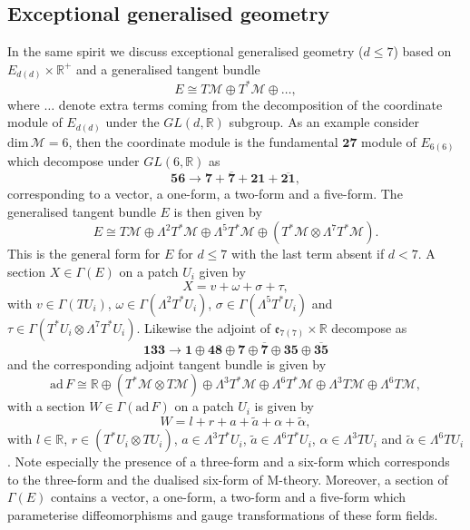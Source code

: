 \subsection{Exceptional generalised geometry}
In the same spirit we discuss exceptional generalised geometry ($d\leq 7$) based on $E_{d(d)}\times \mathbb{R}^+$ and a generalised tangent bundle 
\begin{equation}
    E\cong T\mathcal{M}\oplus T^*\mathcal{M}\oplus\ldots,
\end{equation}
where $\ldots$ denote extra terms coming from the decomposition of the coordinate module of $E_{d(d)}$ under the $GL(d,\mathbb{R})$ subgroup. As an example consider $\text{dim}\,\mathcal{M}=6$, then the coordinate module is the fundamental $\mathbf{27}$ module of $E_{6(6)}$ which decompose under $GL(6,\mathbb{R})$ as 
\begin{equation}
    \mathbf{56}\to \mathbf{7}+\overbar{\mathbf{7}}+\mathbf{21}+\overbar{\mathbf{21}},
\end{equation}
corresponding to a vector, a one-form, a two-form and a five-form. The generalised tangent bundle $E$ is then given by 
\begin{equation}
    E \cong T\mathcal{M}\oplus\Lambda^2T^*\mathcal{M}\oplus\Lambda^5T^*\mathcal{M}\oplus\left(T^*\mathcal{M}\otimes \Lambda^7T^*\mathcal{M}\right).
\end{equation}
This is the general form for $E$ for $d\leq7$ with the last term absent if $d<7$. A section $X\in\Gamma(E)$ on a patch $U_i$ given by 
\begin{equation}
    X = v+\omega+\sigma+\tau,
\end{equation}
with $v\in\Gamma(TU_i)$, $\omega\in\Gamma(\Lambda^2T^*U_i)$, $\sigma\in\Gamma(\Lambda^5T^*U_i)$ and $\tau \in\Gamma(T^*U_i\otimes \Lambda^7T^*U_i)$.  Likewise the adjoint of $\mathfrak{e}_{7(7)}\times\mathbb{R}$ decompose as
\begin{equation}
    \mathbf{133}\to \mathbf{1}\oplus\mathbf{48}\oplus\mathbf{7}\oplus\overbar{\mathbf{7}}\oplus\mathbf{35}\oplus\overbar{\mathbf{35}}
\end{equation}
and the corresponding adjoint tangent bundle is given by
\begin{equation}
    \text{ad}\, F \cong \mathbb{R}\oplus \left(T^*\mathcal{M}\otimes T\mathcal{M}\right)\oplus \Lambda^3 T^*\mathcal{M}\oplus\Lambda^6 T^*\mathcal{M}\oplus\Lambda^3 T\mathcal{M}\oplus\Lambda^6 T\mathcal{M},
\end{equation}
with a section $W\in\Gamma(\text{ad}\,F)$ on a patch $U_i$ is given by
\begin{equation}\label{eq:AdDecompE7}
    W = l+r+a+\tilde{a}+\alpha+\tilde{\alpha},
\end{equation}
with $l\in\mathbb{R}$, $r\in (T^*U_i\otimes TU_i)$, $a\in \Lambda^3 T^*U_i$, $\tilde{a}\in \Lambda^6 T^*U_i$, $\alpha\in\Lambda^3 TU_i$ and $\tilde{\alpha}\in\Lambda^6 TU_i$. Note especially the presence of a three-form and a six-form which corresponds to the three-form and the dualised six-form of M-theory. Moreover, a section of $\Gamma(E)$ contains a vector, a one-form, a two-form and a five-form which parameterise diffeomorphisms and gauge transformations of these form fields. 

